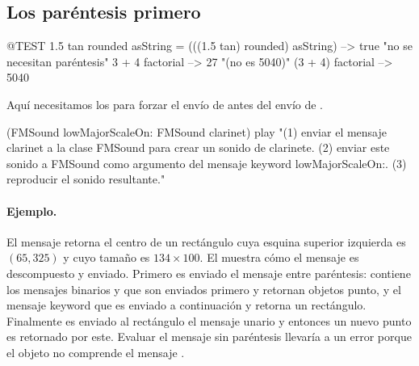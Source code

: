 \documentclass[a4paper,10pt,twoside]{book}
\begin{document}
\subsection{Los par\'entesis primero}


\begin{code}{@TEST}
1.5 tan rounded asString = (((1.5 tan) rounded) asString) --> true    "no se necesitan par\'entesis"
3 + 4 factorial   --> 27    "(no es 5040)"
(3 + 4) factorial --> 5040
\end{code}

Aquí necesitamos los  para forzar el envío de  antes del envío de .
\begin{code}{}
(FMSound lowMajorScaleOn: FMSound clarinet) play
"(1) enviar el mensaje clarinet a la clase FMSound para crear un sonido de clarinete.
 (2) enviar este sonido a FMSound como argumento del mensaje keyword lowMajorScaleOn:.
 (3) reproducir el sonido resultante."
\end{code}



\paragraph{Ejemplo.}
El mensaje  retorna el centro de un rectángulo cuya esquina superior izquierda es $(65, 325)$ y cuyo tamaño es $134{\times}100$. El  muestra cómo el mensaje es descompuesto y enviado. Primero es enviado el mensaje entre paréntesis: contiene los mensajes binarios  y  que son enviados primero y retornan objetos punto, y el mensaje keyword  que es enviado a continuación y retorna un rectángulo. Finalmente es enviado al rectángulo el mensaje unario  y entonces un nuevo punto es retornado por este.
Evaluar el mensaje sin paréntesis llevaría a un error porque el objeto  no comprende el mensaje .
\end{document}
